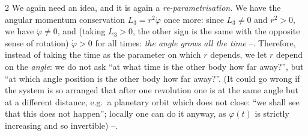 \begin{paracol}{2}
We again need an idea, and it is again a \emph{re-parametrisation}. We have the angular momentum conservation $L_3=r^2\dot\varphi$ once more: since $L_3\neq0$ and $r^2>0$, we have $\dot\varphi\neq0$, and (taking $L_3>0$, the other sign is the same with the opposite sense of rotation) $\dot\varphi>0$ for all times: \emph{the angle grows all the time} --.
Therefore, instead of taking the time as the parameter on which $r$ depends, we let $r$ depend on the \emph{angle}: we do not ask ``at what time is the other body how far away?'', but ``at which angle position is the other body how far away?''. (It could go wrong if the system is so arranged that after one revolution one is at the same angle but at a different distance, e.g.\ a planetary orbit which does not close: ``we shall see that this does not happen''; locally one can do it anyway, as $\varphi(t)$ is strictly increasing and so invertible) --.


\end{paracol}
